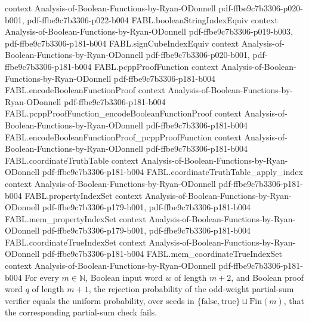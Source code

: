 \begin{theorem}
  {context}
  {Analysis-of-Boolean-Functions-by-Ryan-ODonnell}
  {pdf-ffbe9c7b3306-p020-b001,
    pdf-ffbe9c7b3306-p022-b004}
\proofstep
  {FABL.booleanStringIndexEquiv}
  {context}
  {Analysis-of-Boolean-Functions-by-Ryan-ODonnell}
  {pdf-ffbe9c7b3306-p019-b003,
    pdf-ffbe9c7b3306-p181-b004}
\proofstep
  {FABL.signCubeIndexEquiv}
  {context}
  {Analysis-of-Boolean-Functions-by-Ryan-ODonnell}
  {pdf-ffbe9c7b3306-p020-b001,
    pdf-ffbe9c7b3306-p181-b004}
\proofstep
  {FABL.pcppProofFunction}
  {context}
  {Analysis-of-Boolean-Functions-by-Ryan-ODonnell}
  {pdf-ffbe9c7b3306-p181-b004}
\proofstep
  {FABL.encodeBooleanFunctionProof}
  {context}
  {Analysis-of-Boolean-Functions-by-Ryan-ODonnell}
  {pdf-ffbe9c7b3306-p181-b004}
\proofstep
  {FABL.pcppProofFunction_encodeBooleanFunctionProof}
  {context}
  {Analysis-of-Boolean-Functions-by-Ryan-ODonnell}
  {pdf-ffbe9c7b3306-p181-b004}
\proofstep
  {FABL.encodeBooleanFunctionProof_pcppProofFunction}
  {context}
  {Analysis-of-Boolean-Functions-by-Ryan-ODonnell}
  {pdf-ffbe9c7b3306-p181-b004}
\proofstep
  {FABL.coordinateTruthTable}
  {context}
  {Analysis-of-Boolean-Functions-by-Ryan-ODonnell}
  {pdf-ffbe9c7b3306-p181-b004}
\proofstep
  {FABL.coordinateTruthTable_apply_index}
  {context}
  {Analysis-of-Boolean-Functions-by-Ryan-ODonnell}
  {pdf-ffbe9c7b3306-p181-b004}
\proofstep
  {FABL.propertyIndexSet}
  {context}
  {Analysis-of-Boolean-Functions-by-Ryan-ODonnell}
  {pdf-ffbe9c7b3306-p179-b001,
    pdf-ffbe9c7b3306-p181-b004}
\proofstep
  {FABL.mem_propertyIndexSet}
  {context}
  {Analysis-of-Boolean-Functions-by-Ryan-ODonnell}
  {pdf-ffbe9c7b3306-p179-b001,
    pdf-ffbe9c7b3306-p181-b004}
\proofstep
  {FABL.coordinateTrueIndexSet}
  {context}
  {Analysis-of-Boolean-Functions-by-Ryan-ODonnell}
  {pdf-ffbe9c7b3306-p181-b004}
\proofstep
  {FABL.mem_coordinateTrueIndexSet}
  {context}
  {Analysis-of-Boolean-Functions-by-Ryan-ODonnell}
  {pdf-ffbe9c7b3306-p181-b004}
For every $m\in\mathbb{N}$, Boolean input word $w$ of length $m+2$, and Boolean proof
word $q$ of length $m+1$, the rejection probability of the odd-weight partial-sum
verifier equals the uniform probability, over seeds in
$\{\mathrm{false},\mathrm{true}\}\sqcup\mathrm{Fin}(m)$, that the corresponding
partial-sum check fails.
\end{theorem}

